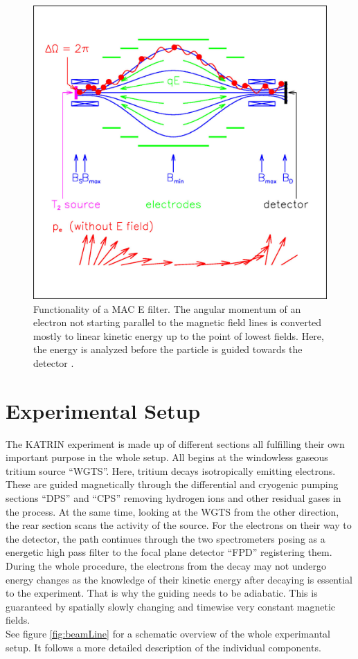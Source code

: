             \begin{figure}
	\centering
      	\includegraphics[width = 0.6 \textwidth]{graphics/katrinExperiment/macEFilter.jpg}
      	\caption[MAC E Filter]{Functionality of a MAC E filter. The angular momentum of an electron not starting parallel to the magnetic field lines is converted mostly to linear kinetic energy up to the point of lowest fields. Here, the energy is analyzed before the particle is guided towards the detector \cite{macEFilter}.}
      	\label{fig:katrinExperiment:macEFilter}
      \end{figure}
      

      \section{Experimental Setup}
      \label{ch:The KATRIN experiment:sec:Experimental setup}
      The KATRIN experiment is made up of different sections all fulfilling their own important purpose in the whole setup. All begins at the windowless gaseous tritium source ``WGTS''. Here, tritium decays isotropically emitting electrons. These are guided magnetically through the differential and cryogenic pumping sections ``DPS'' and ``CPS'' removing hydrogen ions and other residual gases in the process. At the same time, looking at the WGTS from the other direction, the rear section scans the activity of the source. For the electrons on their way to the detector, the path continues through the two spectrometers posing as a energetic high pass filter to the focal plane detector ``FPD'' registering them.\\
      During the whole procedure, the electrons from the decay may not undergo energy changes as the knowledge of their kinetic energy after decaying is essential to the experiment. That is why the guiding needs to be adiabatic. This is guaranteed by spatially slowly changing and timewise very constant magnetic fields.\\
      See figure \ref{fig:beamLine} for a schematic overview of the whole experimantal setup. It follows a more detailed description of the individual components.
      
